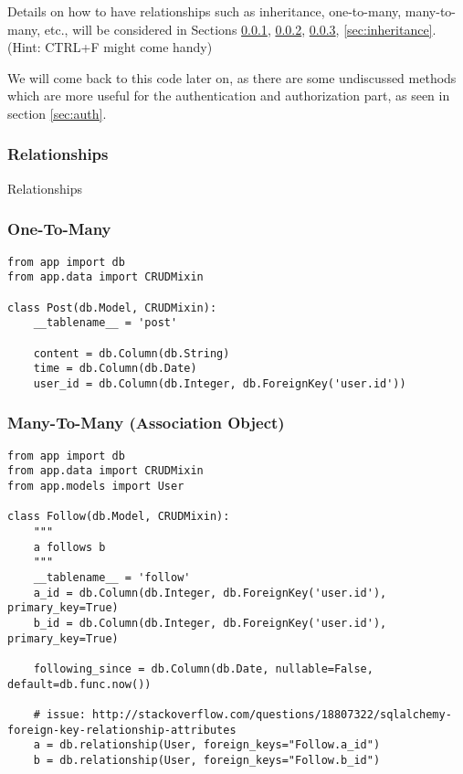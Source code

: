 \documentclass[../main/main.tex]{subfiles}
\begin{document}
Details on how to have relationships such as inheritance, one-to-many,
many-to-many, etc., will be considered in Sections
\ref{sec:relationships}, \ref{sec:onetomany}, \ref{sec:manytomany},
\ref{sec:inheritance}. (Hint: CTRL+F might come handy) 

We will come back to this code later on, as there are some undiscussed
methods which are more useful for the authentication and authorization
part, as seen in section \ref{sec:auth}.

\subsubsection{Relationships}
\label{sec:relationships}

Relationships 

\subsubsection{One-To-Many}
\label{sec:onetomany}

\begin{lstlisting}
from app import db
from app.data import CRUDMixin

class Post(db.Model, CRUDMixin):
    __tablename__ = 'post'

    content = db.Column(db.String)
    time = db.Column(db.Date)
    user_id = db.Column(db.Integer, db.ForeignKey('user.id'))
\end{lstlisting}

\subsubsection{Many-To-Many (Association Object)}
\label{sec:manytomany}

\begin{lstlisting}
from app import db
from app.data import CRUDMixin
from app.models import User

class Follow(db.Model, CRUDMixin):
    """
    a follows b
    """
    __tablename__ = 'follow'
    a_id = db.Column(db.Integer, db.ForeignKey('user.id'), primary_key=True)
    b_id = db.Column(db.Integer, db.ForeignKey('user.id'), primary_key=True)

    following_since = db.Column(db.Date, nullable=False, default=db.func.now())

    # issue: http://stackoverflow.com/questions/18807322/sqlalchemy-foreign-key-relationship-attributes
    a = db.relationship(User, foreign_keys="Follow.a_id")
    b = db.relationship(User, foreign_keys="Follow.b_id")
\end{lstlisting}
\end{document}
